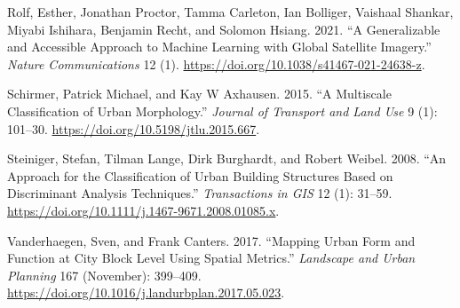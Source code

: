 \documentclass[
  letterpaper,
  DIV=11,
  numbers=noendperiod]{scrartcl}
\newlength{\cslhangindent}
\newenvironment{CSLReferences}[2] %
 {\begin{list}{}{%
  \setlength{\itemindent}{0pt}
  \setlength{\leftmargin}{0pt}
  \setlength{\parsep}{0pt}
  \ifodd #1
   \setlength{\leftmargin}{\cslhangindent}
   \setlength{\itemindent}{-1\cslhangindent}
  \fi
  \setlength{\itemsep}{#2\baselineskip}}}
 {\end{list}}
\begin{document}
\begin{CSLReferences}{1}{0}
Rolf, Esther, Jonathan Proctor, Tamma Carleton, Ian Bolliger, Vaishaal
Shankar, Miyabi Ishihara, Benjamin Recht, and Solomon Hsiang. 2021. {``A
Generalizable and Accessible Approach to Machine Learning with Global
Satellite Imagery.''} \emph{Nature Communications} 12 (1).
\url{https://doi.org/10.1038/s41467-021-24638-z}.

Schirmer, Patrick Michael, and Kay W Axhausen. 2015. {``A Multiscale
Classification of Urban Morphology.''} \emph{Journal of Transport and
Land Use} 9 (1): 101--30. \url{https://doi.org/10.5198/jtlu.2015.667}.

Steiniger, Stefan, Tilman Lange, Dirk Burghardt, and Robert Weibel.
2008. {``An {Approach} for the {Classification} of {Urban Building
Structures Based} on {Discriminant Analysis Techniques}.''}
\emph{Transactions in GIS} 12 (1): 31--59.
\url{https://doi.org/10.1111/j.1467-9671.2008.01085.x}.

Vanderhaegen, Sven, and Frank Canters. 2017. {``Mapping Urban Form and
Function at City Block Level Using Spatial Metrics.''} \emph{Landscape
and Urban Planning} 167 (November): 399--409.
\url{https://doi.org/10.1016/j.landurbplan.2017.05.023}.

\end{CSLReferences}
\end{document}
